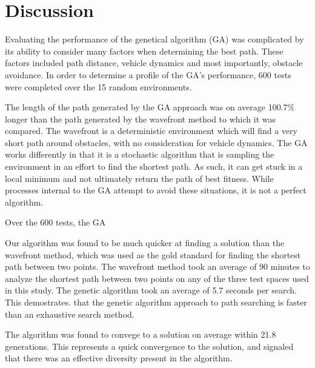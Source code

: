 	
	
\section{Discussion}

Evaluating the performance of the genetical algorithm (GA) was complicated by its ability to consider many factors when determining the best path. These factors included path distance, vehicle dynamics and most importantly, obstacle avoidance. In order to determine a profile of the GA's performance, 600 tests were completed over the 15 random environments.

The length of the path generated by the GA approach was on average 100.7\% longer than the path generated by the wavefront method to which it was compared. The wavefront is a deterministic environment which will find a very short path around obstacles, with no consideration for vehicle dynamics. The GA works differently in that it is a stochastic algorithm that is sampling the environment in an effort to find the shortest path. As such, it can get stuck in a local minimum and not ultimately return the path of best fitness. While processes internal to the GA attempt to avoid these situations, it is not a perfect algorithm.

Over the 600 tests, the GA 

Our algorithm was found to be much quicker at finding a solution than the wavefront method, which was used as the gold standard for finding the shortest path between two points. The wavefront method took an average of 90 minutes to analyze the shortest path between two points on any of the three test spaces used in this study. The genetic algorithm took an average of 5.7 seconds per search. This demostrates. that the genetic algorithm approach to path searching is faster than an exhaustive search method.

The algorithm was found to convege to a solution on average within 21.8 generations. This represents a quick convergence to the solution, and signaled that there was an effective diversity present in the algorithm.

